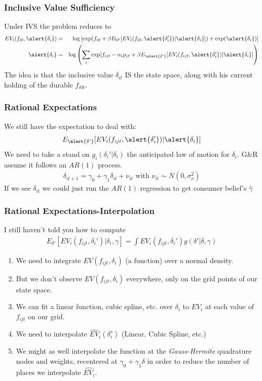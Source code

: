 \documentclass[xcolor=pdftex,dvipsnames,table,mathserif,aspectratio=169]{beamer}
\begin{document}
\begin{frame}
\frametitle{Inclusive Value Sufficiency}
Under IVS the problem reduces to
\begin{eqnarray*}
EV_i(f_{i0}, \alert{\delta_i}) &=& \log\left[ \exp( f_{i0} + \beta E_{\Omega'}[ EV_i (f_{i0}, \alert{\delta_i'}) |\alert{\delta_i}] )+ \exp(\alert{\delta_i})  \right]\\
\alert{\delta_{i}} &=& \log \left( \sum_j \exp[ f_{ijt}  -\alpha_i p_{jt} + \beta E_{\alert{\delta'}}[ E V_i (f_{ijt}, \alert{\delta_i'}) |\alert{\delta_i} ]  \right)
\end{eqnarray*}
The idea is that the inclusive value $\delta_{it}$ IS the state space, along with his current holding of the durable $f_{i0t}$.
\end{frame}


\begin{frame}
\frametitle{Rational Expectations}
We still have the expectation to deal with: 
\begin{eqnarray*}
E_{\alert{\delta'}}[ E V_i (f_{ijt}, \alert{\delta_i'}) |\alert{\delta_i} ]
\end{eqnarray*}
We need to take a stand on $g_i(\delta_i' | \delta_i)$ the anticipated law of motion for $\delta_i$.  G\&R assume it follows an $AR(1)$ process.
\begin{eqnarray*}
\delta_{it+1} = \gamma_0 + \gamma_1 \delta_{it} + \nu_{it} \mbox{ with } \nu_{it} \sim N(0,\sigma_{\nu}^2)
\end{eqnarray*}
If we see $\delta_{it}$ we could just run the $AR(1)$ regression to get consumer belief's $\hat{\gamma}$
\end{frame}


\begin{frame}
\frametitle{Rational Expectations-Interpolation}
I still haven't told you how to compute
\begin{eqnarray*}
E_{\delta'}[ E V_i (f_{ijt}, \delta_i') |\delta_i ,\gamma]= \int EV_i(f_{ijt},\delta_{i}') g(\delta' | \delta,\gamma)
\end{eqnarray*}
\vspace{-0.5cm}
\begin{enumerate}
\item We need to integrate $EV(f_{ijt},\delta_i)$ (a function) over a normal density.
\item But we don't observe $EV(f_{ijt},\delta_i)$ everywhere, only on the grid points of our state space.
\item We can fit a linear function, cubic spline, etc. over $\delta_i$ to $EV_i$ at each value of $f_{ijt}$ on our grid.
\item  We need to \alert{interpolate} $\widehat{EV}_i(\delta_i^s)$ (Linear, Cubic Spline, etc.)
\item We might as well interpolate the function at the \textit{Gauss-Hermite} quadrature nodes and weights, recentered at $\gamma_0 + \gamma_1 \delta$ in order to reduce the number of places we interpolate $\widehat{EV_i}$.
\end{enumerate}
\end{frame}
\end{document}
